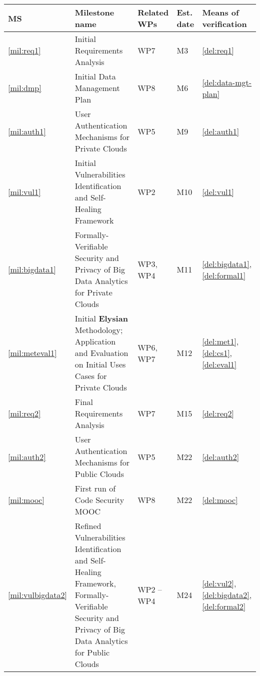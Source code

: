 \documentclass[a4paper,11pt]{article}
\newcommand{\project}[1]{\textbf{#1}\xspace}
\newcommand{\SECURITY}{\project{Elysian}}
\newcommand{\TheProject}{\SECURITY}
\begin{document}
\renewcommand{\thems}{MS\arabic{ms}}
\begin{minipage}{\textwidth}
\begin{center}
 \begin{tabular*}{\textwidth}{|p{1cm}|p{10.3cm}|p{1.2cm}|p{0.6cm}|p{2.7cm}|}  \hline
 \textbf{MS} & \textbf{Milestone name} & \textbf{Related WPs} & \textbf{Est. date} & \textbf{Means of
   verification} \\ %
\hline
\ref{mil:req1} & Initial Requirements Analysis & WP7 & M3 & \ref{del:req1} \\
   \hline
 \ref{mil:dmp} & Initial Data Management Plan & WP8 & M6 & \ref{del:data-mgt-plan} \\
   \hline
\ref{mil:auth1} & User Authentication Mechanisms for Private Clouds & WP5 & M9 & \ref{del:auth1} \\
   \hline
   \ref{mil:vul1} & Initial Vulnerabilities Identification and Self-Healing Framework & WP2 & M10 & \ref{del:vul1} \\
   \hline
   \ref{mil:bigdata1} & Formally-Verifiable Security and Privacy of Big Data Analytics for Private Clouds & WP3, WP4 & M11 & \ref{del:bigdata1}, \ref{del:formal1} \\
   \hline
   \ref{mil:meteval1} & Initial \TheProject{} Methodology; Application and Evaluation on Initial Uses Cases for Private Clouds & WP6, WP7 & M12 & \ref{del:met1}, \ref{del:cs1}, \ref{del:eval1} \\
   \hline
   \ref{mil:req2} & Final Requirements Analysis & WP7 & M15 & \ref{del:req2} \\
   \hline
   \ref{mil:auth2} & User Authentication Mechanisms for Public Clouds & WP5 & M22 & \ref{del:auth2} \\
   \hline
   \ref{mil:mooc} & First run of Code Security MOOC & WP8 & M22 & \ref{del:mooc} \\
   \hline
   \ref{mil:vulbigdata2} & Refined Vulnerabilities Identification and Self-Healing Framework, Formally-Verifiable Security and Privacy of Big Data Analytics for Public Clouds & WP2 -- WP4 & M24 & \ref{del:vul2}, \ref{del:bigdata2}, \ref{del:formal2} \\

\end{tabular*}
\end{center}
\end{minipage}
\end{document}
